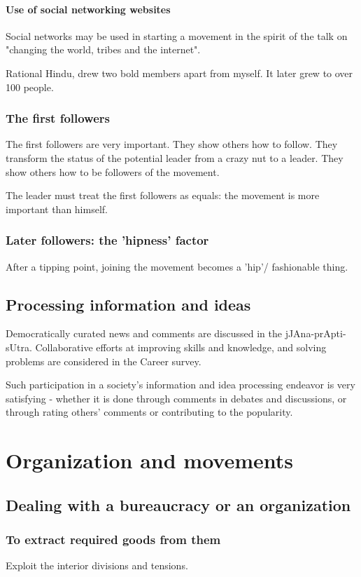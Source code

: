 \documentclass[oneside, article]{memoir}
\begin{document}
\subsubsection{Use of social networking websites}
Social networks may be used in starting a movement in the spirit of the talk on "changing the world, tribes and the internet".

Rational Hindu, drew two bold members apart from myself. It later grew to over 100 people.

\subsection{The first followers}
The first followers are very important. They show others how to follow.  They transform the status of the potential leader from a crazy nut to a leader. They show others how to be followers of the movement.

The leader must treat the first followers as equals: the movement is more important than himself.

\subsection{Later followers: the 'hipness' factor}
After a tipping point, joining the movement becomes a 'hip'/ fashionable thing.

\section{Processing information and ideas}
Democratically curated news and comments are discussed in the jJAna-prApti-sUtra. Collaborative efforts at improving skills and knowledge, and solving problems are considered in the Career survey.

Such participation in a society's information and idea processing endeavor is very satisfying - whether it is done through comments in debates and discussions, or through rating others' comments or contributing to the popularity.

\chapter{Organization and movements}
\section{Dealing with a bureaucracy or an organization}
\subsection{To extract required goods from them}
Exploit the interior divisions and tensions.
\end{document}
